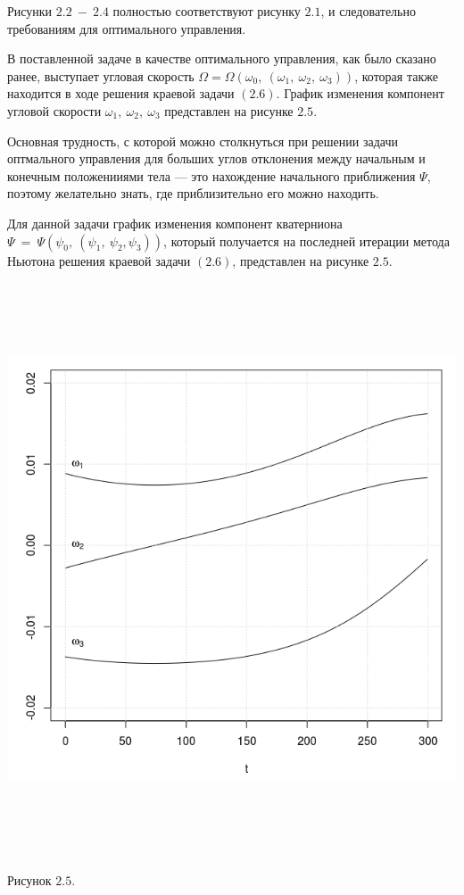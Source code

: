 \documentclass[14pt]{extreport}
\begin{document}
Рисунки $2.2\ -\ 2.4$ полностью соответствуют рисунку $2.1$, и следовательно требованиям для оптимального управления.

В поставленной задаче в качестве оптимального управления, как было сказано ранее, выступает угловая скорость
$\Omega = \Omega(\omega_0,\ (\omega_1,\ \omega_2,\ \omega_3))$, которая также находится в ходе решения краевой задачи $(2.6)$. График изменения
компонент угловой скорости $\omega_1,\ \omega_2,\ \omega_3$ представлен на рисунке $2.5$.

Основная трудность, с которой можно столкнуться при решении задачи оптмального управления для больших углов отклонения между начальным и конечным
положенииями тела --- это нахождение начального приближения $\Psi$, поэтому желательно знать, где приблизительно его можно находить. 

Для данной задачи график изменения компонент кватерниона $\Psi\ =\ \Psi(\psi_0,\ (\psi_1,\ \psi_2, \psi_3))$, который получается на последней итерации
метода Ньютона решения краевой задачи $(2.6)$, представлен на рисунке $2.5$.

\begin{center}
\vspace*{50px}
\includegraphics[width=17cm, height=17cm]{o300.png}

Рисунок $2.5$. 
\end{center}
\end{document}
